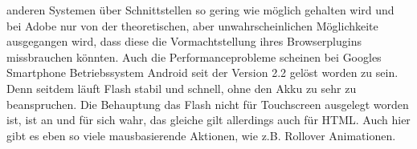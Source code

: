 anderen Systemen über Schnittstellen so gering wie möglich gehalten wird und
bei Adobe nur von der theoretischen, aber unwahrscheinlichen Möglichkeite
ausgegangen wird, dass diese die Vormachtstellung ihres Browserplugins
missbrauchen könnten.
\newline\newline
Auch die Performanceprobleme scheinen bei Googles Smartphone Betriebssystem
Android seit der Version 2.2 gelöst worden zu sein. Denn seitdem läuft
Flash stabil und schnell, ohne den Akku zu sehr zu beanspruchen.
\newline\newline
Die Behauptung das Flash nicht für Touchscreen ausgelegt worden ist, ist an
und für sich wahr, das gleiche gilt allerdings auch für HTML. Auch hier gibt
es eben so viele mausbasierende Aktionen, wie z.B. Rollover Animationen.